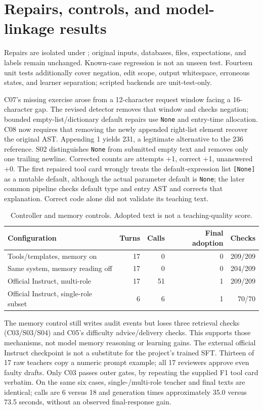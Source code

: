 \section{Repairs, controls, and model-linkage results}
Repairs are isolated under ; original inputs, databases, files, expectations, and labels remain unchanged. Known-case regression is not an unseen test. Fourteen unit tests additionally cover negation, edit scope, output whitespace, erroneous states, and learner separation; scripted backends are unit-test-only.

C07's missing exercise arose from a 12-character request window facing a 16-character gap. The revised detector removes that window and checks negation; bounded empty-list/dictionary default repairs use \texttt{None} and entry-time allocation. C08 now requires that removing the newly appended right-list element recover the original AST. Appending 1 yields 231, a legitimate alternative to the 236 reference. S02 distinguishes \texttt{None} from submitted empty text and removes only one trailing newline. Corrected counts are attempts +1, correct +1, unanswered +0. The first repaired tool card wrongly treats the default-expression list \texttt{[None]} as a mutable default, although the actual parameter default is \texttt{None}; the later common pipeline checks default type and entry AST and corrects that explanation. Correct code alone did not validate its teaching text.

\begin{table}[htbp]\centering\small
\caption{Controller and memory controls. Adopted text is not a teaching-quality score.}\label{tab:concise-agents-controls}
\begin{tabularx}{\linewidth}{@{}Yrrrr@{}}\toprule
Configuration & Turns & Calls & Final adoption & Checks\\\midrule
Tools/templates, memory on &17&0&0&209/209\\
Same system, memory reading off &17&0&0&204/209\\
Official Instruct, multi-role &17&51&1&209/209\\
Official Instruct, single-role subset &6&6&1&70/70\\\bottomrule
\end{tabularx}
\end{table}\FloatBarrier

The memory control still writes audit events but loses three retrieval checks (C03/S03/S04) and C05's difficulty advice/delivery checks. This supports those mechanisms, not model memory reasoning or learning gains. The external official Instruct checkpoint is not a substitute for the project's trained SFT. Thirteen of 17 raw teachers copy a numeric prompt example; all 17 reviewers approve even faulty drafts. Only C03 passes outer gates, by repeating the supplied F1 tool card verbatim. On the same six cases, single-/multi-role teacher and final texts are identical; calls are 6 versus 18 and generation times approximately 35.0 versus 73.5 seconds, without an observed final-response gain.

